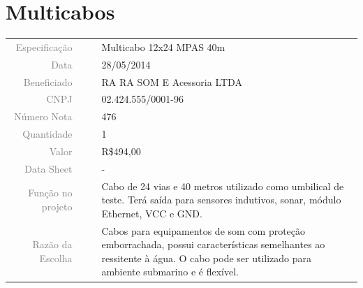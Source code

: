 

\section{Multicabos}
\label{mulicabos}


\begin{table}[ht!]

	\begin{tabular}{r l|l p{12cm} }
		
		\textcolor{gray}{Especificação} &&& 	{Multicabo 12x24 MPAS 40m}\\
		\textcolor{gray}{Data} &&& 				{28/05/2014}\\
        \textcolor{gray}{Beneficiado} &&&		{RA RA SOM E Acessoria LTDA} \\
        \textcolor{gray}{CNPJ} &&& 				{02.424.555/0001-96} \\
        \textcolor{gray}{Número Nota} &&& 		{476} \\
		\textcolor{gray}{Quantidade} &&& 		{1} \\
		\textcolor{gray}{Valor} &&& 			{R\$494,00} \\
		\textcolor{gray}{Data Sheet} &&& 		{-} \\

		\textcolor{gray}{Função no projeto} &&& {Cabo de 24 vias e 40 metros
		utilizado como umbilical de teste. Terá saída para sensores
		indutivos, sonar, módulo Ethernet, VCC e GND.}
		\\
		\textcolor{gray}{Razão da Escolha} &&& {Cabos para equipamentos de som com
		proteção emborrachada, possui características semelhantes ao ressitente à
		água. O cabo pode ser utilizado para ambiente submarino e é flexível.}
		

	\end{tabular}
\end{table}

\newpage
